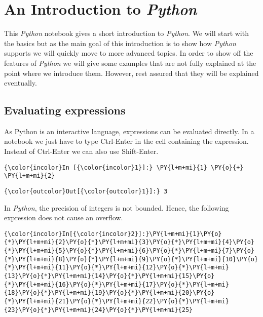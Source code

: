 \section{\texorpdfstring{An Introduction to
\textsl{Python}}{An Introduction to Python}}\label{an-introduction-to-python}
This \textsl{Python} notebook gives a short introduction to \textsl{Python}.
We will start with the basics but as the main goal of this introduction
is to show how \textsl{Python} supports  we will quickly move
to more advanced topics. In order to show off the features of
\textsl{Python} we will give some examples that are not fully explained at
the point where we introduce them. However, rest assured that they will
be explained eventually.

\subsection{Evaluating expressions}\label{evaluating-expressions}
As Python is an interactive language, expressions can be evaluated
directly. In a  notebook we just have to type Ctrl-Enter
in the cell containing the expression. Instead of Ctrl-Enter we can also
use Shift-Enter.

\begin{Verbatim}[commandchars=\\\{\}]
{\color{incolor}In [{\color{incolor}1}]:} \PY{l+m+mi}{1} \PY{o}{+} \PY{l+m+mi}{2}
\end{Verbatim}

\begin{Verbatim}[commandchars=\\\{\}]
{\color{outcolor}Out[{\color{outcolor}1}]:} 3
\end{Verbatim}
            
In \textsl{Python}, the precision of integers is not bounded. Hence, the
following expression does not cause an overflow.

    \begin{Verbatim}[commandchars=\\\{\}]
{\color{incolor}In[{\color{incolor}2}]:}\PY{l+m+mi}{1}\PY{o}{*}\PY{l+m+mi}{2}\PY{o}{*}\PY{l+m+mi}{3}\PY{o}{*}\PY{l+m+mi}{4}\PY{o}{*}\PY{l+m+mi}{5}\PY{o}{*}\PY{l+m+mi}{6}\PY{o}{*}\PY{l+m+mi}{7}\PY{o}{*}\PY{l+m+mi}{8}\PY{o}{*}\PY{l+m+mi}{9}\PY{o}{*}\PY{l+m+mi}{10}\PY{o}{*}\PY{l+m+mi}{11}\PY{o}{*}\PY{l+m+mi}{12}\PY{o}{*}\PY{l+m+mi}{13}\PY{o}{*}\PY{l+m+mi}{14}\PY{o}{*}\PY{l+m+mi}{15}\PY{o}{*}\PY{l+m+mi}{16}\PY{o}{*}\PY{l+m+mi}{17}\PY{o}{*}\PY{l+m+mi}{18}\PY{o}{*}\PY{l+m+mi}{19}\PY{o}{*}\PY{l+m+mi}{20}\PY{o}{*}\PY{l+m+mi}{21}\PY{o}{*}\PY{l+m+mi}{22}\PY{o}{*}\PY{l+m+mi}{23}\PY{o}{*}\PY{l+m+mi}{24}\PY{o}{*}\PY{l+m+mi}{25}
\end{Verbatim}


